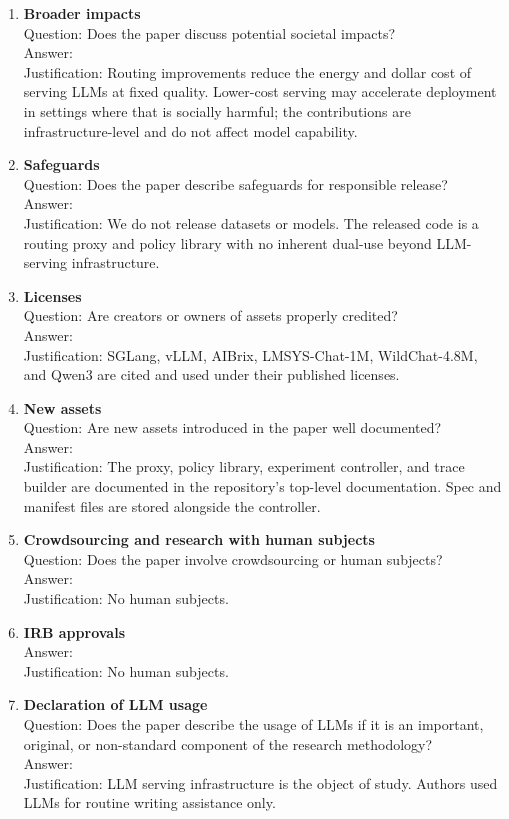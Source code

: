 \documentclass{article}
\begin{document}
\begin{enumerate}
\item {\bf Broader impacts}\\
Question: Does the paper discuss potential societal impacts?\\
Answer: \answerYes{}\\
Justification: Routing improvements reduce the energy and dollar cost of serving LLMs at fixed quality. Lower-cost serving may accelerate deployment in settings where that is socially harmful; the contributions are infrastructure-level and do not affect model capability.

\item {\bf Safeguards}\\
Question: Does the paper describe safeguards for responsible release?\\
Answer: \answerNA{}\\
Justification: We do not release datasets or models. The released code is a routing proxy and policy library with no inherent dual-use beyond LLM-serving infrastructure.

\item {\bf Licenses}\\
Question: Are creators or owners of assets properly credited?\\
Answer: \answerYes{}\\
Justification: SGLang, vLLM, AIBrix, LMSYS-Chat-1M, WildChat-4.8M, and Qwen3 are cited and used under their published licenses.

\item {\bf New assets}\\
Question: Are new assets introduced in the paper well documented?\\
Answer: \answerYes{}\\
Justification: The proxy, policy library, experiment controller, and trace builder are documented in the repository's top-level documentation. Spec and manifest files are stored alongside the controller.

\item {\bf Crowdsourcing and research with human subjects}\\
Question: Does the paper involve crowdsourcing or human subjects?\\
Answer: \answerNA{}\\
Justification: No human subjects.

\item {\bf IRB approvals}\\
Answer: \answerNA{}\\
Justification: No human subjects.

\item {\bf Declaration of LLM usage}\\
Question: Does the paper describe the usage of LLMs if it is an important, original, or non-standard component of the research methodology?\\
Answer: \answerNA{}\\
Justification: LLM serving infrastructure is the object of study. Authors used LLMs for routine writing assistance only.

\end{enumerate}
\end{document}
